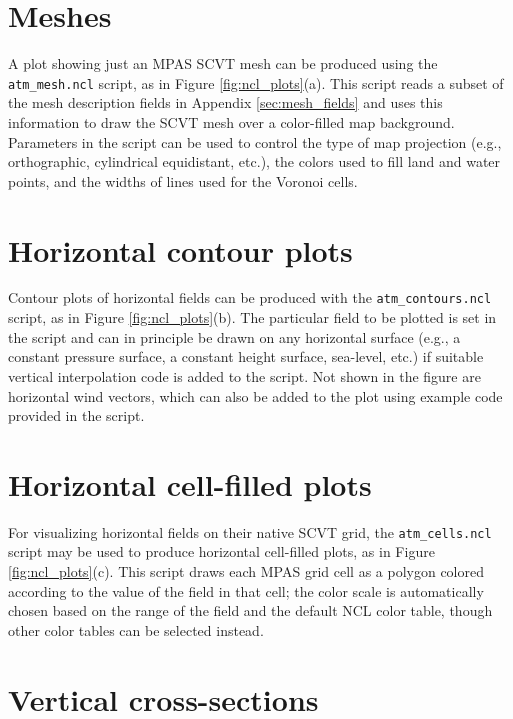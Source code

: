 \documentclass[11pt]{report}
\begin{document}
\section{Meshes}

A plot showing just an MPAS SCVT mesh can be produced using the {\tt atm\_mesh.ncl} script, as in Figure \ref{fig:ncl_plots}(a). This script
reads a subset of the mesh description fields in Appendix \ref{sec:mesh_fields} and uses this information to draw the SCVT mesh over a 
color-filled map background. Parameters in the script can be used to control the type of map projection (e.g., orthographic, cylindrical equidistant, etc.), 
the colors used to fill land and water points, and the widths of lines used for the Voronoi cells.


\section{Horizontal contour plots}

Contour plots of horizontal fields can be produced with the {\tt atm\_contours.ncl} script, as in Figure \ref{fig:ncl_plots}(b). The particular
field to be plotted is set in the script and can in principle be drawn on any horizontal surface (e.g., a constant pressure
surface, a constant height surface, sea-level, etc.) if suitable vertical interpolation code is added to the script. Not shown in the figure are horizontal
wind vectors, which can also be added to the plot using example code provided in the script.


\section{Horizontal cell-filled plots}

For visualizing horizontal fields on their native SCVT grid, the {\tt atm\_cells.ncl} script may be used to produce horizontal cell-filled plots, 
as in Figure \ref{fig:ncl_plots}(c). This script draws each MPAS grid cell as a polygon colored according to the value of the field in that
cell; the color scale is automatically chosen based on the range of the field and the default NCL color table, though other color tables can
be selected instead.


\section{Vertical cross-sections}
\end{document}
